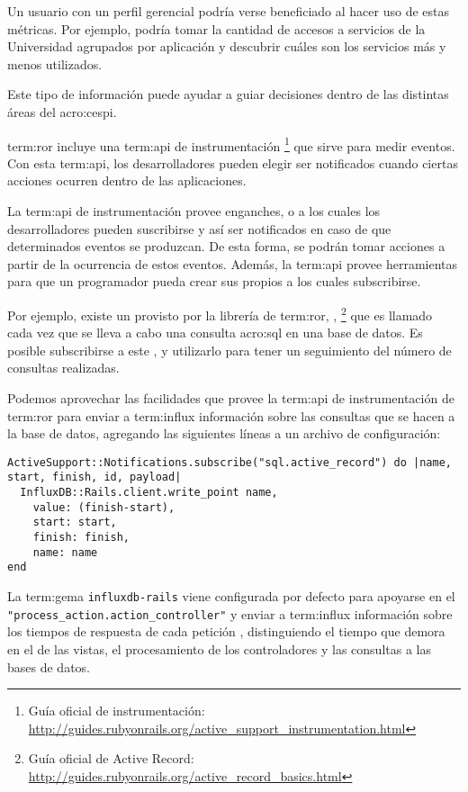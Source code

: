 Un usuario con un perfil gerencial podría verse beneficiado al hacer uso de
estas métricas. Por ejemplo, podría tomar la cantidad de accesos a servicios de
la Universidad agrupados por aplicación y descubrir cuáles son los servicios
más y menos utilizados.

Este tipo de información puede ayudar a guiar decisiones dentro de las
distintas áreas del \gls{acro:cespi}.

\gls{term:ror} incluye una \gls{term:api} de instrumentación
\footnote{Guía oficial de instrumentación:
\url{http://guides.rubyonrails.org/active_support_instrumentation.html}}
que sirve para medir eventos. Con esta \gls{term:api}, los desarrolladores
pueden elegir ser notificados cuando ciertas acciones ocurren dentro de las
aplicaciones.

La \gls{term:api} de instrumentación provee enganches, o  a los
cuales los desarrolladores pueden suscribirse y así ser notificados en caso de
que determinados eventos se produzcan. De esta forma, se podrán tomar acciones
a partir de la ocurrencia de estos eventos. Además, la \gls{term:api} provee
herramientas para que un programador pueda crear sus propios  a los
cuales subscribirse.

Por ejemplo, existe un  provisto por la librería de \gls{term:ror},
,
\footnote{Guía oficial de Active Record:
\url{http://guides.rubyonrails.org/active_record_basics.html}} que es
llamado cada vez que se lleva a cabo una consulta \gls{acro:sql} en una base de datos. Es
posible subscribirse a este , y utilizarlo para tener un seguimiento
del número de consultas realizadas.

Podemos aprovechar las facilidades que provee la \gls{term:api} de
instrumentación de \gls{term:ror} para enviar a \gls{term:influx} información
sobre las consultas que se hacen a la base de datos, agregando las siguientes
líneas a un archivo de configuración:

\begin{lstlisting}
ActiveSupport::Notifications.subscribe("sql.active_record") do |name, start, finish, id, payload|
  InfluxDB::Rails.client.write_point name,
    value: (finish-start),
    start: start,
    finish: finish,
    name: name
end
\end{lstlisting}

La \gls{term:gema} \texttt{influxdb-rails} viene configurada por defecto para
apoyarse en el  \lstinline{"process_action.action_controller"} y
enviar a \gls{term:influx} información sobre los tiempos de respuesta de cada
petición , distinguiendo el tiempo que demora en el 
de las vistas, el procesamiento de los controladores y las consultas a las bases
de datos.

